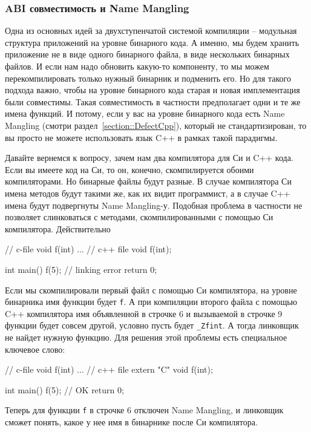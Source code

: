 \subsubsection{ABI совместимость и Name Mangling}

Одна из основных идей за двухступенчатой системой компиляции -- модульная структура приложений на уровне бинарного кода.
А именно, мы будем хранить приложение не в виде одного бинарного файла, в виде нескольких бинарных файлов.
И если нам надо обновить какую-то компоненту, то мы можем перекомпилировать только нужный бинарник и подменить его.
Но для такого подхода важно, чтобы на уровне бинарного кода старая и новая имплементация были совместимы.
Такая совместимость в частности предполагает одни и те же имена функций.
И потому, если у вас на уровне бинарного кода есть Name Mangling (смотри раздел~\ref{section::DefectCpp}), который не стандартизирован, то вы просто не можете использовать язык C++ в рамках такой парадигмы.

Давайте вернемся к вопросу, зачем нам два компилятора для Си и C++ кода.
Если вы имеете код на Си, то он, конечно, скомпилируется обоими компиляторами.
Но бинарные файлы будут разные.
В случае компилятора Си имена методов будут такими же, как их видит программист, а в случае C++ имена будут подвергнуты Name Mangling-у.
Подобная проблема в частности не позволяет слинковаться с методами, скомпилированными с помощью Си компилятора.
Действительно
\begin{cppcode}
// c-file 
void f(int) {
...
}
// c++ file
void f(int);

int main() {
  f(5); // linking error
  return 0;
}
\end{cppcode}
Если мы скомпилировали первый файл с помощью Си компилятора, на уровне бинарника имя функции будет \verb"f".
А при компиляции второго файла с помощью C++ компилятора имя объявленной в строчке 6 и вызываемой в строчке 9 функции будет совсем другой, условно пусть будет \verb"_Zfint".
А тогда линковщик не найдет нужную функцию.
Для решения этой проблемы есть специальное ключевое слово: %
\begin{cppcode}
// c-file 
void f(int) {
...
}
// c++ file
extern "C" void f(int);

int main() {
  f(5); // OK
  return 0;
}
\end{cppcode}
Теперь для функции \verb"f" в строчке 6 отключен Name Mangling, и линковщик сможет понять, какое у нее имя в бинарнике после Си компилятора.

